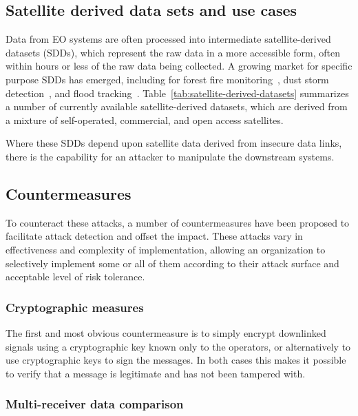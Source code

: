 \subsection{Satellite derived data sets and use cases}

Data from EO systems are often processed into intermediate satellite-derived datasets (SDDs), which represent the raw data in a more accessible form, often within hours or less of the raw data being collected.
A growing market for specific purpose SDDs has emerged, including for forest fire monitoring~\cite{nasaFirms}, dust storm detection~\cite{sarikhani2021new}, and flood tracking~\cite{cloudToStreet}.
Table~\ref{tab:satellite-derived-datasets} summarizes a number of currently available satellite-derived datasets, which are derived from a mixture of self-operated, commercial, and open access satellites.

Where these SDDs depend upon satellite data derived from insecure data links, there is the capability for an attacker to manipulate the downstream systems.

\subsection{Countermeasures}

To counteract these attacks, a number of countermeasures have been proposed to facilitate attack detection and offset the impact.
These attacks vary in effectiveness and complexity of implementation, allowing an organization to selectively implement some or all of them according to their attack surface and acceptable level of risk tolerance.

\subsubsection{Cryptographic measures}

The first and most obvious countermeasure is to simply encrypt downlinked signals using a cryptographic key known only to the operators, or alternatively to use cryptographic keys to sign the messages.
In both cases this makes it possible to verify that a message is legitimate and has not been tampered with.


\subsubsection{Multi-receiver data comparison}

